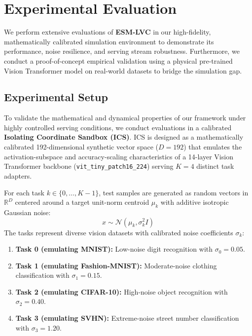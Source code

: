 \section{Experimental Evaluation}
\label{sec:experiments}

We perform extensive evaluations of \textbf{ESM-LVC} in our high-fidelity, mathematically calibrated simulation environment to demonstrate its performance, noise resilience, and serving stream robustness. Furthermore, we conduct a proof-of-concept empirical validation using a physical pre-trained Vision Transformer model on real-world datasets to bridge the simulation gap.

\subsection{Experimental Setup}
To validate the mathematical and dynamical properties of our framework under highly controlled serving conditions, we conduct evaluations in a calibrated \textbf{Isolating Coordinate Sandbox (ICS)}. ICS is designed as a mathematically calibrated 192-dimensional synthetic vector space ($D=192$) that emulates the activation-subspace and accuracy-scaling characteristics of a 14-layer Vision Transformer backbone (\texttt{vit\_tiny\_patch16\_224}) serving $K=4$ distinct task adapters.

For each task $k \in \{0, \dots, K-1\}$, test samples are generated as random vectors in $\mathbb{R}^D$ centered around a target unit-norm centroid $\mu_k$ with additive isotropic Gaussian noise:
\begin{equation}
    x \sim \mathcal{N}\left(\mu_k, \sigma_k^2 I\right)
\end{equation}
The tasks represent diverse vision datasets with calibrated noise coefficients $\sigma_k$:
\begin{enumerate}
    \item \textbf{Task 0 (emulating MNIST):} Low-noise digit recognition with $\sigma_0 = 0.05$.
    \item \textbf{Task 1 (emulating Fashion-MNIST):} Moderate-noise clothing classification with $\sigma_1 = 0.15$.
    \item \textbf{Task 2 (emulating CIFAR-10):} High-noise object recognition with $\sigma_2 = 0.40$.
    \item \textbf{Task 3 (emulating SVHN):} Extreme-noise street number classification with $\sigma_3 = 1.20$.
\end{enumerate}

